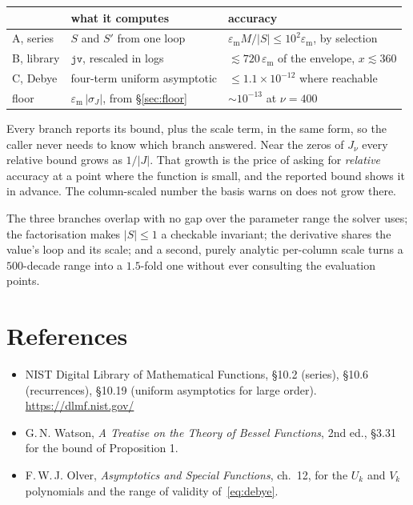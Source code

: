 \documentclass[11pt]{article}
\theoremstyle{remark}
\newcommand{\code}[1]{\texttt{#1}}
\newcommand{\eps}{\varepsilon_{\mathrm{m}}}
\begin{document}
\begin{center}
\begin{tabular}{lll}
\toprule
& what it computes & accuracy\\
\midrule
A, series & $S$ and $S'$ from one loop & $\eps M/|S|\le10^2\eps$, by selection\\
B, library & $\code{jv}$, rescaled in logs & $\lesssim 720\,\eps$ of the envelope, $x\lesssim360$\\
C, Debye & four-term uniform asymptotic & $\le 1.1\times10^{-12}$ where reachable\\
\midrule
floor & $\eps\,|\sigma_J|$, from \S\ref{sec:floor} & $\sim10^{-13}$ at $\nu=400$\\
\bottomrule
\end{tabular}
\end{center}

\noindent
Every branch reports its bound, plus the scale term, in the same form, so the caller never
needs to know which branch answered. Near the zeros of $J_\nu$ every relative bound grows as
$1/|J|$. That growth is the price of asking for \emph{relative} accuracy at a point where the
function is small, and the reported bound shows it in advance. The column-scaled number the
basis warns on does not grow there.

The three branches overlap with no gap over the parameter range the solver uses; the
factorisation makes $|S|\le1$ a checkable invariant; the derivative shares the value's loop
and its scale; and a second, purely analytic per-column scale turns a $500$-decade range into
a $1.5$-fold one without ever consulting the evaluation points.

\section*{References}

\begin{itemize}
\item NIST Digital Library of Mathematical Functions, \S10.2 (series), \S10.6 (recurrences),
      \S10.19 (uniform asymptotics for large order). \url{https://dlmf.nist.gov/}
\item G.\,N. Watson, \emph{A Treatise on the Theory of Bessel Functions}, 2nd ed., \S3.31
      for the bound of Proposition 1.
\item F.\,W.\,J. Olver, \emph{Asymptotics and Special Functions}, ch.~12, for the $U_k$ and
      $V_k$ polynomials and the range of validity of~\eqref{eq:debye}.
\end{itemize}
\end{document}
